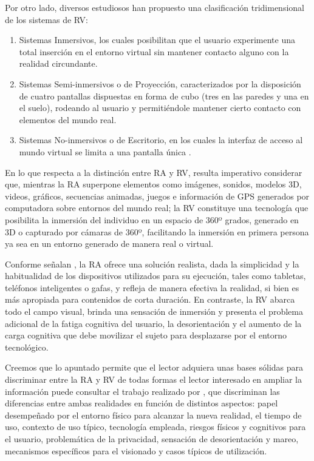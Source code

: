 \documentclass[spanish]{textolivre}
\begin{document}
Por otro lado, diversos estudiosos han propuesto una clasificación tridimensional de los sistemas de RV:

\begin{enumerate}
\item Sistemas Inmersivos, los cuales posibilitan que el usuario experimente una total inserción en el entorno virtual sin mantener contacto alguno con la realidad circundante.
\item Sistemas Semi-inmersivos o de Proyección, caracterizados por la disposición de cuatro pantallas dispuestas en forma de cubo (tres en las paredes y una en el suelo), rodeando al usuario y permitiéndole mantener cierto contacto con elementos del mundo real.
\item Sistemas No-inmersivos o de Escritorio, en los cuales la interfaz de acceso al mundo virtual se limita a una pantalla única \cite{otegui2017realidad}.
\end{enumerate} 
 
En lo que respecta a la distinción entre RA y RV, resulta imperativo considerar que, mientras la RA superpone elementos como imágenes, sonidos, modelos 3D, videos, gráficos, secuencias animadas, juegos e información de GPS generados por computadora sobre entornos del mundo real; la RV constituye una tecnología que posibilita la inmersión del individuo en un espacio de 360º grados, generado en 3D o capturado por cámaras de 360º, facilitando la inmersión en primera persona ya sea en un entorno generado de manera real o virtual.
 
Conforme señalan \textcite{park2022metaverse}, la RA ofrece una solución realista, dada la simplicidad y la habitualidad de los dispositivos utilizados para su ejecución, tales como tabletas, teléfonos inteligentes o gafas, y refleja de manera efectiva la realidad, si bien es más apropiada para contenidos de corta duración. En contraste, la RV abarca todo el campo visual, brinda una sensación de inmersión y presenta el problema adicional de la fatiga cognitiva del usuario, la desorientación y el aumento de la carga cognitiva que debe movilizar el sujeto para desplazarse por el entorno tecnológico.

Creemos que lo apuntado permite que el lector adquiera unas bases sólidas para discriminar entre la RA y RV de todas formas el lector interesado en ampliar la información puede consultar el trabajo realizado por \textcite{rauschnabel2022xr}, que discriminan las diferencias entre ambas realidades en función de distintos aspectos: papel desempeñado por el entorno físico para alcanzar la nueva realidad, el tiempo de uso, contexto de uso típico, tecnología empleada, riesgos físicos y cognitivos para el usuario, problemática de la privacidad, sensación de desorientación y mareo, mecanismos específicos para el visionado y casos típicos de utilización.
\end{document}
